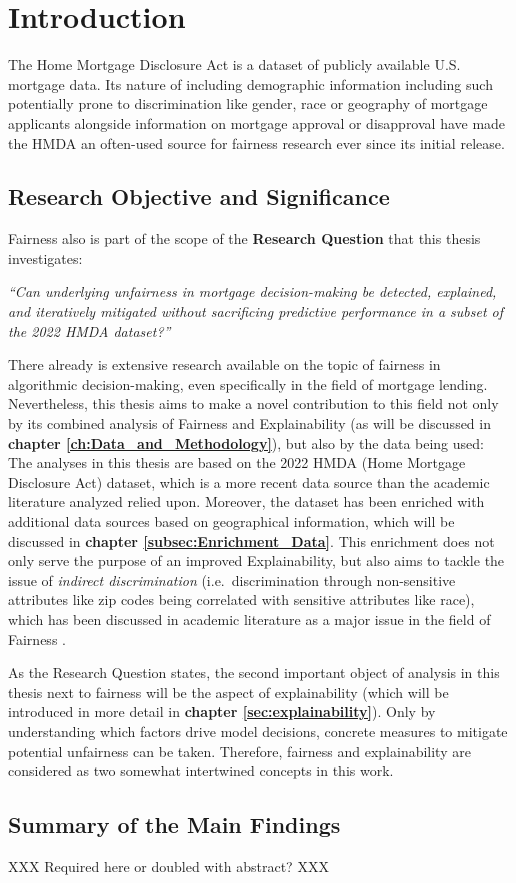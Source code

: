 \chapter{Introduction}\label{ch:Introduction}

The Home Mortgage Disclosure Act \parencite{HMDA2022} is a dataset of publicly available U.S. mortgage data. Its nature of including demographic information including such potentially prone to discrimination like gender, race or geography of mortgage applicants alongside information on mortgage approval or disapproval have made the HMDA an often-used source for fairness research ever since its initial release.

\section{Research Objective and Significance}\label{sec:Research_Objective_and_Significance}

Fairness also is part of the scope of the \textbf{Research Question} that this thesis investigates:

\textit{“Can underlying unfairness in mortgage decision-making be detected, explained, and iteratively mitigated without sacrificing predictive performance in a subset of the 2022 HMDA dataset?”}

There already is extensive research available on the topic of fairness in algorithmic decision-making, even specifically in the field of mortgage lending.
Nevertheless, this thesis aims to make a novel contribution to this field not only by its combined analysis of Fairness and Explainability (as will be discussed in \textbf{chapter \ref{ch:Data_and_Methodology}}),
but also by the data being used: The analyses in this thesis are based on the 2022 HMDA (Home Mortgage Disclosure Act) dataset, which is a more recent data source than the academic literature analyzed relied upon.
Moreover, the dataset has been enriched with additional data sources based on geographical information, which will be discussed in \textbf{chapter \ref{subsec:Enrichment_Data}}.
This enrichment does not only serve the purpose of an improved Explainability, but also aims to tackle the issue of \textit{indirect discrimination} (i.e.\ discrimination through non-sensitive attributes like zip codes being correlated with sensitive attributes like race), 
which has been discussed in academic literature as a major issue in the field of Fairness \parencite{Mehrabi2021}.

As the Research Question states, the second important object of analysis in this thesis next to fairness will be the aspect of explainability (which will be introduced in more detail in \textbf{chapter \ref{sec:explainability}}). Only by understanding which factors drive model decisions, concrete measures to mitigate potential unfairness can be taken. Therefore, fairness and explainability are considered as two somewhat intertwined concepts in this work.

\section{Summary of the Main Findings}\label{sec:Summary_of_the_Main_Findings}

XXX Required here or doubled with abstract? XXX